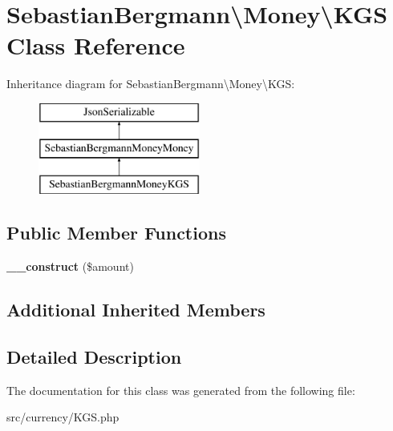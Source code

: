 \hypertarget{classSebastianBergmann_1_1Money_1_1KGS}{}\section{Sebastian\+Bergmann\textbackslash{}Money\textbackslash{}K\+G\+S Class Reference}
\label{classSebastianBergmann_1_1Money_1_1KGS}
Inheritance diagram for Sebastian\+Bergmann\textbackslash{}Money\textbackslash{}K\+G\+S\+:\begin{figure}[H]
\begin{center}
\leavevmode
\includegraphics[height=3.000000cm]{classSebastianBergmann_1_1Money_1_1KGS}
\end{center}
\end{figure}
\subsection*{Public Member Functions}
\begin{DoxyCompactItemize}
\item 
\hypertarget{classSebastianBergmann_1_1Money_1_1KGS_a68d47d3ec4afbbdc40766269496b3529}{}{\bfseries \+\_\+\+\_\+construct} (\$amount)\label{classSebastianBergmann_1_1Money_1_1KGS_a68d47d3ec4afbbdc40766269496b3529}

\end{DoxyCompactItemize}
\subsection*{Additional Inherited Members}


\subsection{Detailed Description}


The documentation for this class was generated from the following file\+:\begin{DoxyCompactItemize}
\item 
src/currency/K\+G\+S.\+php\end{DoxyCompactItemize}

